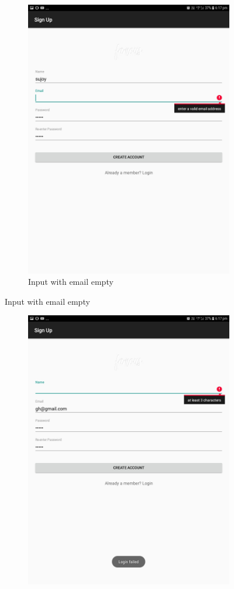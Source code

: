 \documentclass{scrreprt}
\begin{document}
\begin{itemize}
\begin{enumerate}
\begin{figure}[H]
\begin{subfigure}{0.5\textwidth}
\includegraphics[width=0.85\linewidth, keepaspectratio]{signupemptyemail.jpg}
\caption{Input with email empty}
\label{fig:subim2}
\end{subfigure}
\end{figure}
\begin{figure}[H]
\begin{subfigure}{0.5\textwidth}
\includegraphics[width=0.85\linewidth, keepaspectratio]{signupemptyname.jpg} 

\end{subfigure}
\end{figure}
\end{enumerate}
\end{itemize}
\end{document}
